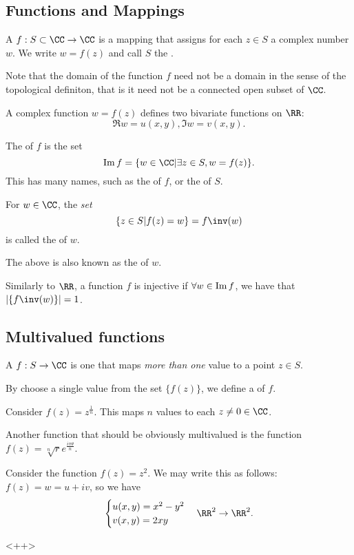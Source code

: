 \subsection{Functions and Mappings}

\begin{definition}
A  $f: S\subset{\CC} \to \CC$ is a mapping that assigns for each $z \in S$ a complex number $w$. We write $w = f(z)$ and call $S$ the . 
\end{definition}

Note that the domain of the function $f$ need not be a domain in the sense of the topological definiton, that is it need not be a connected open subset of $\CC$. 

A complex function $w = f(z)$ defines two bivariate functions on $\RR$: 
\[ \Re{w} = u(x,y), \Im{w} = v(x,y). \] 

The  of $f$ is the set 
\[ \image{f} = \{ w \in \CC | \exists z \in S, w = f(z) \} . \] This has many names, such as the  of $f$, or the  of $S$. 

\begin{definition}
For $w \in \CC$, the \emph{set}
\[ \{ z \in S | f(z) = w \} = f\inv (w) \] is called the  of $w$. 
\end{definition}
The above is also known as the  of $w$. 

Similarly to $\RR$, a function $f$ is injective if $\forall w \in \operatorname{Im}{f}$, we have that $|\{f\inv (w)\}| = 1$. 

\subsection{Multivalued functions}

\begin{definition}
A  $f: S \to \CC$ is one that maps \emph{more than one} value to a point $z \in S$. 
\end{definition}
By choose a single value from the set $\{f(z)\}$, we define a  of $f$. 

\begin{example}
Consider $f(z) = z^{\frac{1}{n}}$. This maps $n$ values to each $z \neq 0 \in \CC$. 
\end{example}
Another function that should be obviously multivalued is the function $f(z) = \sqrt[n]{r} e^{\frac{i \pi \theta}{n}}$. 
\begin{example}
Consider the function $f(z) = z^2$. We may write this as follows: $f(z) = w = u + iv$, so we have 
\[ 
\begin{cases}
u(x,y) = x^2 - y^2 \\ 
v(x,y) = 2xy
\end{cases} \RR^2 \to \RR^2. 
\] 
\end{example}<++>
